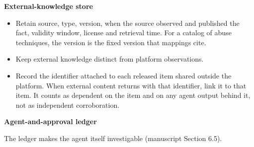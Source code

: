 \documentclass[
  11pt,
]{article}
\providecommand{\tightlist}{%
  \setlength{\itemsep}{0pt}\setlength{\parskip}{0pt}}
\renewcommand{\tightlist}{\setlength{\itemsep}{0pt plus 1pt}\setlength{\parskip}{0pt}}
\begin{document}

\textbf{External-knowledge store}

\begin{itemize}
\tightlist
\item
  Retain source, type, version, when the source observed and published
  the fact, validity window, license and retrieval time. For a catalog
  of abuse techniques, the version is the fixed version that mappings
  cite.
\item
  Keep external knowledge distinct from platform observations.
\item
  Record the identifier attached to each released item shared outside
  the platform. When external content returns with that identifier, link
  it to that item. It counts as dependent on the item and on any agent
  output behind it, not as independent corroboration.
\end{itemize}

\textbf{Agent-and-approval ledger}

The ledger makes the agent itself investigable (manuscript Section 6.5).
\end{document}

